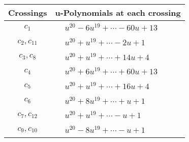\documentclass[1p]{elsarticle_modified}
\theoremstyle{definition}
\begin{document}
\begin{tabular}{m{50pt}|m{274pt}}
Crossings & \hspace{64pt}u-Polynomials at each crossing \\
\hline $$\begin{aligned}c_{1}\end{aligned}$$&$\begin{aligned}
&u^{20}-6 u^{19}+\cdots-60 u+13
\end{aligned}$\\
\hline $$\begin{aligned}c_{2},c_{11}\end{aligned}$$&$\begin{aligned}
&u^{20}+u^{19}+\cdots-2 u+1
\end{aligned}$\\
\hline $$\begin{aligned}c_{3},c_{8}\end{aligned}$$&$\begin{aligned}
&u^{20}+u^{19}+\cdots+14 u+4
\end{aligned}$\\
\hline $$\begin{aligned}c_{4}\end{aligned}$$&$\begin{aligned}
&u^{20}+6 u^{19}+\cdots+60 u+13
\end{aligned}$\\
\hline $$\begin{aligned}c_{5}\end{aligned}$$&$\begin{aligned}
&u^{20}+u^{19}+\cdots+16 u+4
\end{aligned}$\\
\hline $$\begin{aligned}c_{6}\end{aligned}$$&$\begin{aligned}
&u^{20}+8 u^{19}+\cdots+u+1
\end{aligned}$\\
\hline $$\begin{aligned}c_{7},c_{12}\end{aligned}$$&$\begin{aligned}
&u^{20}+u^{19}+\cdots- u+1
\end{aligned}$\\
\hline $$\begin{aligned}c_{9},c_{10}\end{aligned}$$&$\begin{aligned}
&u^{20}-8 u^{19}+\cdots- u+1
\end{aligned}$\\
\hline
\end{tabular}\\~\\
\end{document}
